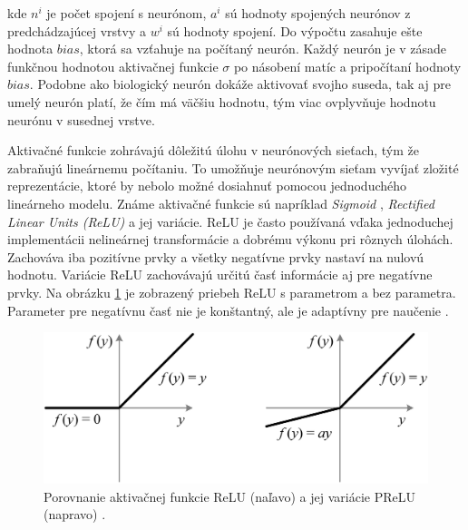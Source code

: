 kde \begin{math}n^{i}\end{math} je počet spojení s neurónom, \begin{math}a^{i}\end{math} sú hodnoty spojených neurónov z predchádzajúcej vrstvy a \begin{math}w^{i}\end{math} sú hodnoty spojení. Do výpočtu zasahuje ešte hodnota \begin{math}bias\end{math}, ktorá sa vzťahuje na počítaný neurón. Každý neurón je v zásade funkčnou hodnotou aktivačnej funkcie \begin{math}\sigma\end{math} po násobení matíc a pripočítaní hodnoty \begin{math}bias\end{math}. Podobne ako biologický neurón dokáže aktivovať svojho suseda, tak aj pre umelý neurón platí, že čím má väčšiu hodnotu, tým viac ovplyvňuje hodnotu neurónu v susednej vrstve.


Aktivačné funkcie zohrávajú dôležitú úlohu v neurónových sieťach, tým že zabraňujú lineárnemu počítaniu. To umožňuje neurónovým sieťam vyvíjať zložité reprezentácie, ktoré by nebolo možné dosiahnuť pomocou jednoduchého lineárneho modelu. Známe aktivačné funkcie sú napríklad \textit{Sigmoid} \cite{sigmoid}, \textit{Rectified Linear Units (ReLU)} \cite{relu} a jej variácie. ReLU je často používaná vďaka jednoduchej implementácii nelineárnej transformácie a dobrému výkonu pri rôznych úlohách. Zachováva iba pozitívne prvky a všetky negatívne prvky nastaví na nulovú hodnotu. Variácie ReLU zachovávajú určitú časť informácie aj pre negatívne prvky. Na obrázku \ref{img:rr} je zobrazený priebeh ReLU s parametrom a bez parametra. Parameter pre negatívnu časť nie je konštantný, ale je adaptívny pre naučenie \cite{prelu}.
\\
\begin{figure}[ht]
    \centering
    \includegraphics[width=.6\textwidth]{images/02/relu_prelu.png}
    \caption{Porovnanie aktivačnej funkcie ReLU (naľavo) a jej variácie PReLU (napravo) \cite{prelu}.}
    \label{img:rr}
\end{figure}

